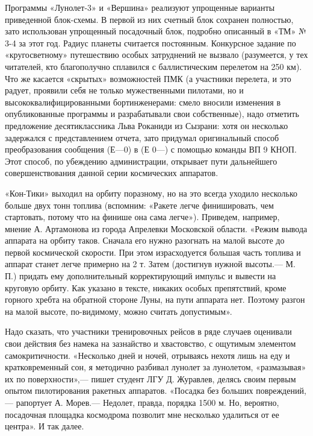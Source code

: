 \documentclass[11pt,a4paper,oneside]{article}
\begin{document}
Программы «Лунолет-3» и «Вершина» реализуют упрощенные варианты приведенной блок-схемы. В первой из них счетный блок сохранен полностью, зато использован упрощенный посадочный блок, подробно описанный в «ТМ» № 3-4 за этот год. Радиус планеты считается постоянным. Конкурсное задание по «кругосветному» путешествию особых затруднений не вызвало (разумеется, у тех читателей, кто благополучно сплавился с баллистическим перелетом на 250 км). Что же касается «скрытых» возможностей ПМК (а участники перелета, и это радует, проявили себя не только мужественными пилотами, но и высококвалифицированными бортинженерами: смело вносили изменения в опубликованные программы и разрабатывали свои собственные), надо отметить предложение десятиклассника Льва Роканиди из Сызрани: хотя он несколько задержался с представлением отчета, зато придумал оригинальный способ преобразования сообщения (Е—0) в (Е 0—) с помощью команды ВП 9 КНОП. Этот способ, по убеждению администрации, открывает пути дальнейшего совершенствования данной серии космических аппаратов.

«Кон-Тики» выходил на орбиту поразному, но на это всегда уходило несколько больше двух тонн топлива (вспомним: «Ракете легче финишировать, чем стартовать, потому что на финише она сама легче»). Приведем, например, мнение А. Артамонова из города Апрелевки Московской области. «Режим вывода аппарата на орбиту таков. Сначала его нужно разогнать на малой высоте до первой космической скорости. При этом израсходуется большая часть топлива и аппарат станет легче примерно на 2 т. Затем (достигнув нужной высоты.— М. П.) придать ему дополнительный корректирующий импульс и вывести на круговую орбиту. Как указано в тексте, никаких особых препятствий, кроме горного хребта на обратной стороне Луны, на пути аппарата нет. Поэтому разгон на малой высоте, по-видимому, можно считать допустимым».

Надо сказать, что участники тренировочных рейсов в ряде случаев оценивали свои действия без намека на зазнайство и хвастовство, с ощутимым элементом самокритичности. «Несколько дней и ночей, отрываясь нехотя лишь на еду и кратковременный сон, я методично разбивал лунолет за лунолетом, «размазывая» их по поверхности»,— пишет студент ЛГУ Д. Журавлев, делясь своим первым опытом пилотирования ракетных аппаратов. «Посадка без больших повреждений,— рапортует А. Морев.— Недолет, правда, порядка 1500 м. Но, вероятно, посадочная площадка космодрома позволит мне несколько удалиться от ее центра». И так далее.
\end{document}
